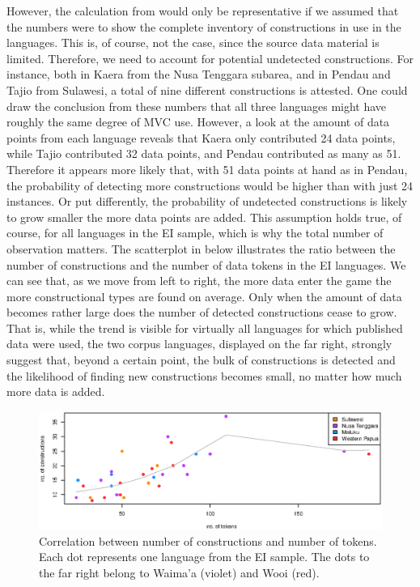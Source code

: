 However, the calculation from  would only be representative if we assumed that the numbers were to show the complete inventory of constructions in use in the languages. This is, of course, not the case, since the source data material is limited. Therefore, we need to account for potential undetected constructions. For instance, both in Kaera from the Nusa Tenggara subarea, and in Pendau and Tajio from Sulawesi, a total of nine different constructions is attested. One could draw the conclusion from these numbers that all three languages might have roughly the same degree of MVC use. However, a look at the amount of data points from each language reveals that Kaera only contributed 24 data points, while Tajio contributed 32 data points, and Pendau contributed as many as 51. Therefore it appears more likely that, with 51 data points at hand as in Pendau, the probability of detecting more constructions would be higher than with just 24 instances. Or put differently, the probability of undetected constructions is likely to grow smaller the more data points are added. This assumption holds true, of course, for all languages in the EI sample, which is why the total number of observation matters. The scatterplot in  below illustrates the ratio between the number of constructions and the number of data tokens in the EI languages. We can see that, as we move from left to right, the more data enter the game the more constructional types are found on average. Only when the amount of data becomes rather large does the number of detected constructions cease to grow. That is, while the trend is visible for virtually all languages for which published data were used, the two corpus languages, displayed on the far right, strongly suggest that, beyond a certain point, the bulk of constructions is detected and the likelihood of finding new constructions becomes small, no matter how much more data is added.

\begin{figure}
\includegraphics[width=\linewidth]{figures/constructions_tokens_clean.eps}
\caption[Correlation between number of constructions and number of tokens]{Correlation between number of constructions and number of tokens. Each dot represents one language from the EI sample. The dots to the far right belong to Waima'a (violet) and Wooi (red).}\label{fig:constructions_tokens}
\end{figure}

